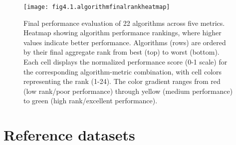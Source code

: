 \begin{figure}[htbp]
    \centering
    \texttt{[image: fig4.1.algorithmfinalrankheatmap]}
    \caption[Final performance evaluation of 22 algorithms across five metrics.]{Final performance evaluation of 22 algorithms across five metrics. Heatmap showing algorithm performance rankings, where higher values indicate better performance. Algorithms (rows) are ordered by their final aggregate rank from best (top) to worst (bottom). Each cell displays the normalized performance score (0-1 scale) for the corresponding algorithm-metric combination, with cell colors representing the rank (1-24). The color gradient ranges from red (low rank/poor performance) through yellow (medium performance) to green (high rank/excellent performance). }
    \label{fig:fig4.1.algorithmfinalrankheatmap}
\end{figure}


\section{Reference datasets} %
\label{sec:referencedatasetsresults}


